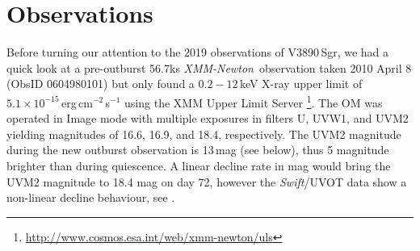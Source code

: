 \documentclass{aa}
\newcommand{\swift}{{\it Swift}}
\newcommand{\xmm}{{\it XMM-Newton}}
\begin{document}
\begin{figure*}[!ht]
\caption{\label{fig:xmmlc}\xmm\ X-ray and UV light curves (units counts
per second) extracted from MOS1 (Small Window, 200-850\,eV range),
MOS2 (Timing Mode, 200-850\,eV range), and
the Optical Monitor (Image+Fast mode with the UVM2 filter:
$\sim 1620-2620$\,\AA\ range). In the top panel, shaded areas
mark three light curve segments analysed separately in 
\S\ref{sect:analysis:timing}. 22 short orange dotted vertical
lines are spaced by 18.1 minutes (centered in the secondary
dip within egress from the deep dip), corresponding to the
frequency of 0.92\,mHz discussed in \S\ref{sect:analysis:timing}.
Of these 22 marks, 8 (36\%) correspond to an anomaly in the light curve
(deep dip in-/egress or small dip) while the duty cycle increases
to 50\% (5/10) after the dip leading to a formally statistical detection.
In the bottom panel, the high time resolution OM Fast mode light curve
is shown in black. Three OM Image mode exposures were taken simultaneously
with each OM Fast mode segment, and the average Image mode count rates
are shown with the horizontal orange lines covering the start/stop times.
The red horizontal lines mark the magnitude range 12.97 to 12.99 within
which the sources gradually fades from start to the end of the observation.
This magnitude range is $\sim 5$ mag brighter than during quiescence
(see text). See \S\ref{sect:descr:lc} for discussion.
}
\end{figure*}

\section{Observations}
\label{sect:obs}

Before turning our attention to the 2019 observations of V3890\,Sgr,
we had a quick look at a pre-outburst 56.7ks \xmm\ observation
taken 2010 April 8 (ObsID 0604980101) but only found a $0.2 - 12$\,keV
X-ray upper limit of $5.1\times 10^{-15}$\,erg\,cm$^{-2}$\,s$^{-1}$
using the XMM Upper Limit Server
\footnote{\url{http://www.cosmos.esa.int/web/xmm-newton/uls}}.
The OM was operated in Image mode with multiple exposures in filters U, UVW1,
and UVM2 yielding magnitudes of 16.6, 16.9, and 18.4, respectively. The UVM2
magnitude during the new outburst observation is 13\,mag (see below),
thus 5 magnitude brighter than during quiescence. A linear decline rate
in mag would bring the UVM2 magnitude to 18.4 mag on day 72, however the
\swift/UVOT data show a non-linear decline behaviour, see 
\cite{page20}.\\
\end{document}
